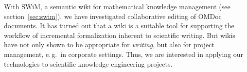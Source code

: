 With SWiM, a semantic wiki for mathematical knowledge management (see
section~\ref{sec:swim}), we have investigated collaborative editing of OMDoc documents.
It has turned out that a wiki is a suitable tool for supporting the workflow of
incremental formalization inherent to scientific writing.  But wikis have not only shown
to be appropriate for \emph{writing}, but also for project management, e.\,g.\ in
corporate settings\cite{leuf01:wikiway}.  Thus, we are interested in applying our
technologies to scientific knowledge engineering projects.  
